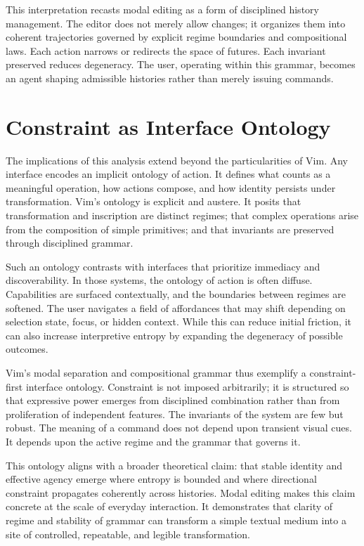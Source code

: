 \documentclass[12pt]{article}
\begin{document}
This interpretation recasts modal editing as a form of disciplined history management. The editor does not merely allow changes; it organizes them into coherent trajectories governed by explicit regime boundaries and compositional laws. Each action narrows or redirects the space of futures. Each invariant preserved reduces degeneracy. The user, operating within this grammar, becomes an agent shaping admissible histories rather than merely issuing commands.

\section{Constraint as Interface Ontology}

The implications of this analysis extend beyond the particularities of Vim. Any interface encodes an implicit ontology of action. It defines what counts as a meaningful operation, how actions compose, and how identity persists under transformation. Vim’s ontology is explicit and austere. It posits that transformation and inscription are distinct regimes; that complex operations arise from the composition of simple primitives; and that invariants are preserved through disciplined grammar.

Such an ontology contrasts with interfaces that prioritize immediacy and discoverability. In those systems, the ontology of action is often diffuse. Capabilities are surfaced contextually, and the boundaries between regimes are softened. The user navigates a field of affordances that may shift depending on selection state, focus, or hidden context. While this can reduce initial friction, it can also increase interpretive entropy by expanding the degeneracy of possible outcomes.

Vim’s modal separation and compositional grammar thus exemplify a constraint-first interface ontology. Constraint is not imposed arbitrarily; it is structured so that expressive power emerges from disciplined combination rather than from proliferation of independent features. The invariants of the system are few but robust. The meaning of a command does not depend upon transient visual cues. It depends upon the active regime and the grammar that governs it.

This ontology aligns with a broader theoretical claim: that stable identity and effective agency emerge where entropy is bounded and where directional constraint propagates coherently across histories. Modal editing makes this claim concrete at the scale of everyday interaction. It demonstrates that clarity of regime and stability of grammar can transform a simple textual medium into a site of controlled, repeatable, and legible transformation.
\end{document}
